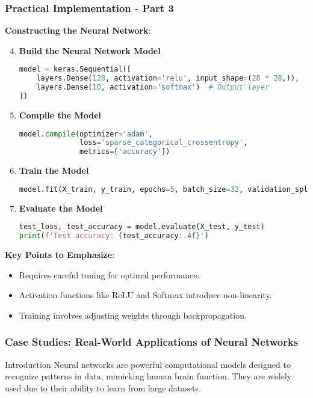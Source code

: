 \documentclass[aspectratio=169]{beamer}
\begin{document}
\begin{frame}[fragile]
    \frametitle{Practical Implementation - Part 3}
    \textbf{Constructing the Neural Network}:

    \begin{enumerate}
        \setcounter{enumi}{3} %
        \item \textbf{Build the Neural Network Model}
        \begin{lstlisting}[language=python]
model = keras.Sequential([
    layers.Dense(128, activation='relu', input_shape=(28 * 28,)),  # Hidden layer
    layers.Dense(10, activation='softmax')  # Output layer
])
        \end{lstlisting}

        \item \textbf{Compile the Model}
        \begin{lstlisting}[language=python]
model.compile(optimizer='adam',
              loss='sparse_categorical_crossentropy',
              metrics=['accuracy'])
        \end{lstlisting}

        \item \textbf{Train the Model}
        \begin{lstlisting}[language=python]
model.fit(X_train, y_train, epochs=5, batch_size=32, validation_split=0.2)
        \end{lstlisting}

        \item \textbf{Evaluate the Model}
        \begin{lstlisting}[language=python]
test_loss, test_accuracy = model.evaluate(X_test, y_test)
print(f'Test accuracy: {test_accuracy:.4f}')
        \end{lstlisting}
    \end{enumerate}
    
    \textbf{Key Points to Emphasize}:
    \begin{itemize}
        \item Requires careful tuning for optimal performance.
        \item Activation functions like ReLU and Softmax introduce non-linearity.
        \item Training involves adjusting weights through backpropagation.
    \end{itemize}
\end{frame}

\begin{frame}[fragile]
    \frametitle{Case Studies: Real-World Applications of Neural Networks}
    \begin{block}{Introduction}
        Neural networks are powerful computational models designed to recognize patterns in data, mimicking human brain function. They are widely used due to their ability to learn from large datasets.
    \end{block}
\end{frame}
\end{document}
